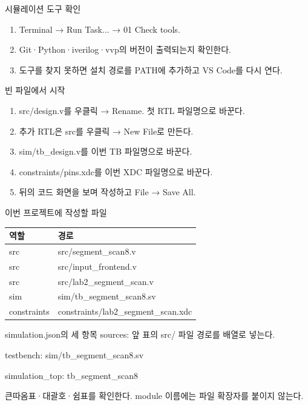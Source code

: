 \begin{frame}{시뮬레이션 도구 확인}
\small
\begin{enumerate}
\item Terminal → Run Task... → 01 Check tools.
\item Git·Python·iverilog·vvp의 버전이 출력되는지 확인한다.
\item 도구를 찾지 못하면 설치 경로를 PATH에 추가하고 VS Code를 다시 연다.
\end{enumerate}
\end{frame}

\begin{frame}{빈 파일에서 시작}
\small
\begin{enumerate}
\item src/design.v를 우클릭 → Rename. 첫 RTL 파일명으로 바꾼다.
\item 추가 RTL은 src를 우클릭 → New File로 만든다.
\item sim/tb\_design.v를 이번 TB 파일명으로 바꾼다.
\item constraints/pins.xdc를 이번 XDC 파일명으로 바꾼다.
\item 뒤의 코드 화면을 보며 작성하고 File → Save All.
\end{enumerate}
\end{frame}

\begin{frame}{이번 프로젝트에 작성할 파일}
\small
\begin{center}\renewcommand{\arraystretch}{1.55}\begin{tabular}{ll}
역할 & 경로\\\hline
src & src/segment\_scan8.v\\
src & src/input\_frontend.v\\
src & src/lab2\_segment\_scan.v\\
sim & sim/tb\_segment\_scan8.sv\\
constraints & constraints/lab2\_segment\_scan.xdc\\
\end{tabular}\end{center}
\end{frame}

\begin{frame}{simulation.json의 세 항목}
\small
sources: 앞 표의 src/ 파일 경로를 배열로 넣는다.\par\vspace{0.26cm}testbench: sim/tb\_segment\_scan8.sv\par\vspace{0.26cm}simulation\_top: tb\_segment\_scan8\par\vspace{0.26cm}큰따옴표·대괄호·쉼표를 확인한다. module 이름에는 파일 확장자를 붙이지 않는다.\par
\end{frame}


